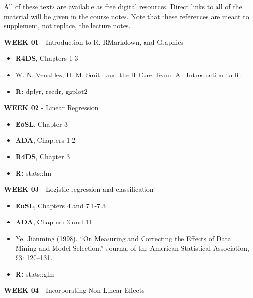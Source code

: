 \documentclass[12pt]{article}
\begin{document}
All of these texts are available as free digital resources. Direct
links to all of the material will be given in the course notes.
Note that these references are meant to supplement, not replace,
the lecture notes.

\vspace{0.5cm}


\textbf{WEEK 01} - Introduction to R, RMarkdown, and Graphics

\begin{itemize}\setlength\itemsep{0em}
\item \textbf{R4DS}, Chapters 1-3
\item W. N. Venables, D. M. Smith and the R Core Team. An Introduction to R.
\item \textbf{R:} dplyr, readr, ggplot2
\end{itemize}

\vspace{0.2cm}

\textbf{WEEK 02} - Linear Regression

\begin{itemize}\setlength\itemsep{0em}
\item \textbf{EoSL}, Chapter 3
\item \textbf{ADA}, Chapters 1-2
\item \textbf{R4DS}, Chapter 3
\item \textbf{R:} stats::lm
\end{itemize}

\vspace{0.2cm}

\textbf{WEEK 03} - Logistic regression and classification

\begin{itemize}\setlength\itemsep{0em}
\item \textbf{EoSL}, Chapters 4 and 7.1-7.3
\item \textbf{ADA}, Chapters 3 and 11
\item Ye, Jianming (1998). ``On Measuring and Correcting the Effects of Data Mining and Model Selection.'' Journal of the American Statistical Association, 93: 120–131.
\item \textbf{R:} stats::glm
\end{itemize}

\vspace{0.2cm}

\textbf{WEEK 04} - Incorporating Non-Linear Effects
\end{document}
